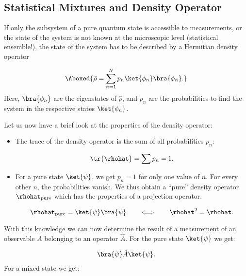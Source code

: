 \subsection{Statistical Mixtures and Density Operator}

If only the subsystem of a pure quantum state is accessible to measurements, or the state of the system is not known at the microscopic level (statistical ensemble!), the state of the system has to be described by a Hermitian density operator

\begin{align}
				\Aboxed{\hat{\rho} = \sum_{n=1}^N p_n \ket{\phi_n}\bra{\phi_n}.}
			
\end{align}
			Here, $\bra{\phi_n}$ are the eigenstates of $\hat{\rho}$, and $p_n$ are the probabilities to find the system in the respective states $\ket{\phi_n}$.

Let us now have a brief look at the properties of the density operator:

\begin{itemize}
				\item The trace of the density operator is the sum of all probabilities $p_n$:

\begin{align}
					\tr{\rhohat} = \sum p_n = 1.
				
\end{align}
								\item For a pure state $\ket{\psi}$, we get $p_n=1$ for only one value of $n$. For every other $n$, the probabilities vanish. We thus obtain a ``pure'' density operator $\rhohat_{\text{pure}}$ which has the properties of a projection operator:

\begin{align}
					\rhohat_{\text{pure}} = \ket{\psi}\bra{\psi} \qquad \Longleftrightarrow \qquad \rhohat^2 = \rhohat.
				
\end{align}
			
\end{itemize}
						With this knowledge we can now determine the result of a measurement of an observable $A$ belonging to an operator $\hat{A}$. For the pure state $\ket{\psi}$ we get:

\begin{align}
				\bra{\psi} \hat{A} \ket{\psi}.
			
\end{align}
						For a mixed state we get:

